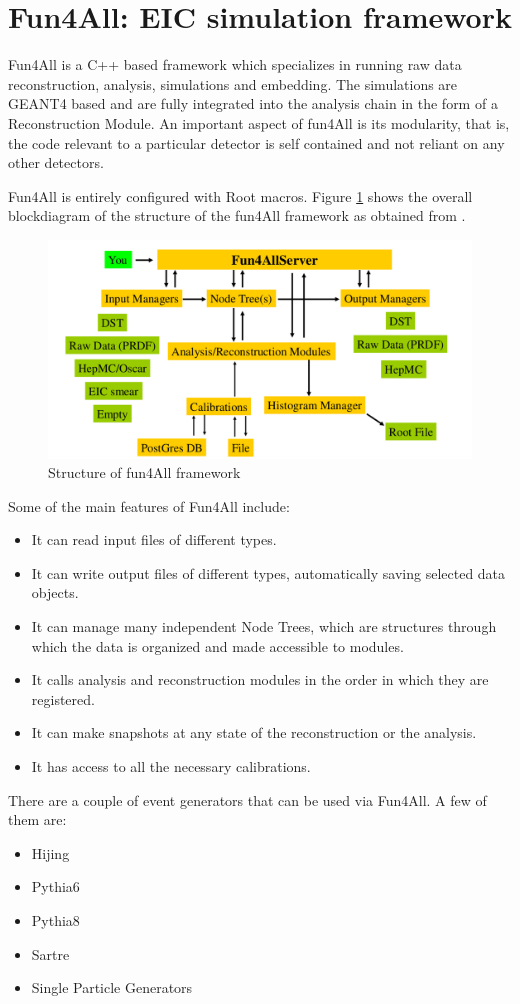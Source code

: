 \section{Fun4All: EIC simulation framework} %

Fun4All is a C++ based framework which specializes in running raw data reconstruction, analysis, simulations and embedding. The simulations are GEANT4 based and are fully integrated into the analysis chain in the form of a Reconstruction Module. An important aspect of fun4All is its modularity, that is, the code relevant to a particular detector is self contained and not reliant on any other detectors. 

Fun4All is entirely configured with Root macros. Figure \ref{fig:fun4all} shows the overall blockdiagram of the structure of the fun4All framework as obtained from \cite{fun4all}.

\begin{figure}[H]
        \centering
		\includegraphics[width=1\linewidth]{Chapters/fun4All.png}
		\caption{Structure of fun4All framework}
		\label{fig:fun4all}
\end{figure}

Some of the main features of Fun4All include:
\begin{itemize}
    \item It can read input files of different types.
    \item It can write output files of different types, automatically saving selected data objects.
    \item It can manage many independent Node Trees, which are structures through which the data is organized and made accessible to modules.
    \item It calls analysis and reconstruction modules in the order in which they are registered.
    \item It can make snapshots at any state of the reconstruction or the analysis.
    \item It has access to all the necessary calibrations.
\end{itemize}

There are a couple of event generators that can be used via Fun4All. A few of them are:
\begin{itemize}
    \item Hijing
    \item Pythia6
    \item Pythia8
    \item Sartre
    \item Single Particle Generators
\end{itemize}


